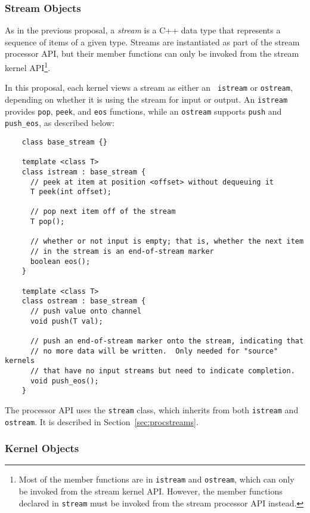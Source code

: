 \subsubsection{Stream Objects}
\label{sec:kerstreams}

As in the previous proposal, a {\it stream} is a C++ data type that
represents a sequence of items of a given type.  Streams are
instantiated as part of the stream processor API, but their member
functions can only be invoked from the stream kernel API\footnote{Most
of the member functions are in {\tt istream} and {\tt ostream}, which
can only be invoked from the stream kernel API.  However, the member
functions declared in {\tt stream} must be invoked from the stream
processor API instead.}.

In this proposal, each kernel views a stream as either an {\tt
istream} or {\tt ostream}, depending on whether it is using the stream
for input or output.  An {\tt istream} provides {\tt pop}, {\tt peek},
and {\tt eos} functions, while an {\tt ostream} supports {\tt push}
and {\tt push\_eos}, as described below: {\small
\begin{verbatim}
    class base_stream {}

    template <class T>
    class istream : base_stream {
      // peek at item at position <offset> without dequeuing it
      T peek(int offset);

      // pop next item off of the stream
      T pop();

      // whether or not input is empty; that is, whether the next item
      // in the stream is an end-of-stream marker
      boolean eos();
    }

    template <class T>
    class ostream : base_stream {
      // push value onto channel
      void push(T val);

      // push an end-of-stream marker onto the stream, indicating that
      // no more data will be written.  Only needed for "source" kernels
      // that have no input streams but need to indicate completion.
      void push_eos();
    }  
\end{verbatim}}

The processor API uses the {\tt stream} class, which inherits from
both {\tt istream} and {\tt ostream}. It is described in
Section~\ref{sec:procstreams}.

\subsubsection{Kernel Objects}
\label{sec:kernels}


